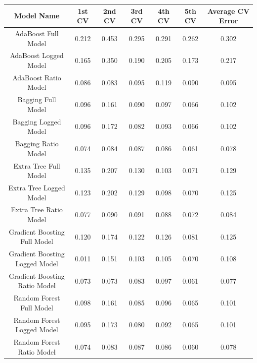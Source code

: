 \documentclass{article}
\begin{document}
\begin{center}
 \begin{tabular}{||c c c c c c c||} 
 \hline
 Model Name & 1st CV & 2nd CV & 3rd CV & 4th CV & 5th CV & Average CV Error \\ [0.5ex] 
 \hline\hline
 AdaBoost Full Model & 0.212 & 0.453 & 0.295 & 0.291 & 0.262 & 0.302 \\ 
 \hline
 AdaBoost Logged Model & 0.165 & 0.350 & 0.190 & 0.205 & 0.173 & 0.217 \\ 
 \hline
 AdaBoost Ratio Model & 0.086 & 0.083 & 0.095 & 0.119 & 0.090 & 0.095 \\ 
 \hline
  Bagging Full Model & 0.096 & 0.161 & 0.090 & 0.097 & 0.066 & 0.102 \\ 
 \hline
  Bagging Logged Model & 0.096 & 0.172 & 0.082 & 0.093 & 0.066 & 0.102 \\ 
 \hline
  Bagging Ratio Model & 0.074 & 0.084 & 0.087 & 0.086 & 0.061 & 0.078 \\ 
 \hline
  Extra Tree Full Model & 0.135 & 0.207 & 0.130 & 0.103 & 0.071 & 0.129 \\ 
 \hline
  Extra Tree Logged Model & 0.123 & 0.202 & 0.129 & 0.098 & 0.070 & 0.125 \\ 
 \hline
  Extra Tree Ratio Model & 0.077 & 0.090 & 0.091 & 0.088 & 0.072 & 0.084 \\ 
 \hline
   Gradient Boosting Full Model & 0.120 & 0.174 & 0.122 & 0.126 & 0.081 & 0.125 \\ 
 \hline
   Gradient Boosting Logged Model & 0.011 & 0.151 & 0.103 & 0.105 & 0.070 & 0.108 \\ 
 \hline
   Gradient Boosting Ratio Model & 0.073 & 0.073 & 0.083 & 0.097 & 0.061 & 0.077 \\ 
 \hline
   Random Forest Full Model & 0.098 & 0.161 & 0.085 & 0.096 & 0.065 & 0.101 \\ 
 \hline
   Random Forest Logged Model & 0.095 & 0.173 & 0.080 & 0.092 & 0.065 & 0.101 \\ 
 \hline
   Random Forest Ratio Model & 0.074 & 0.083 & 0.087 & 0.086 & 0.060 & 0.078 \\ [1ex] 
 \hline
\end{tabular}
\end{center}
\end{document}

